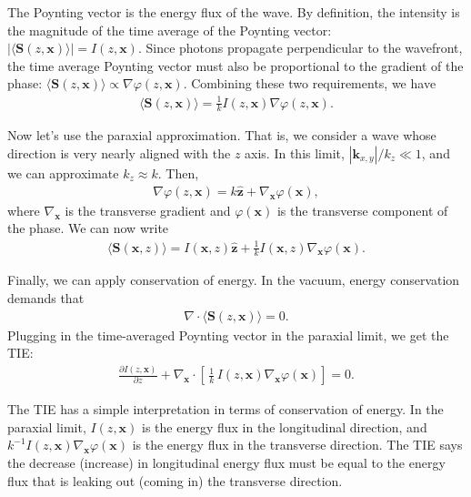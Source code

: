 \documentclass[TS,authoryear,toc]{lsstdoc}
\begin{document}
The Poynting vector is the energy flux of the wave.
By definition, the intensity is the magnitude of the time average of the Poynting vector: $|\langle \mathbf{S}(z, \mathbf{x}) \rangle| = I(z, \mathbf{x})$.
Since photons propagate perpendicular to the wavefront, the time average Poynting vector must also be proportional to the gradient of the phase: $\langle \mathbf{S}(z, \mathbf{x}) \rangle \propto \nabla \varphi(z, \mathbf{x})$.
Combining these two requirements, we have
\begin{align}
    \langle \mathbf{S}(z, \mathbf{x}) \rangle = \frac{1}{k} I(z, \mathbf{x}) \nabla \varphi(z, \mathbf{x}).
\end{align}

Now let's use the paraxial approximation.
That is, we consider a wave whose direction is very nearly aligned with the $z$ axis.
In this limit, $|\mathbf{k}_{x,y}| / k_z \ll 1$, and we can approximate $k_z \approx k$.
Then,
\begin{align}
    \nabla \varphi(z, \mathbf{x}) = k \hat{\mathbf{z}} + \nabla_\mathbf{x} \varphi(\mathbf{x}),
\end{align}
where $\nabla_\mathbf{x}$ is the transverse gradient and $\varphi(\mathbf{x})$ is the transverse component of the phase.
We can now write
\begin{align}
    \langle \mathbf{S}(\mathbf{x}, z) \rangle = 
    I(\mathbf{x}, z) \hat{\mathbf{z}} + \frac{1}{k} I(\mathbf{x}, z) \nabla_\mathbf{x} \varphi(\mathbf{x}).
\end{align}

Finally, we can apply conservation of energy.
In the vacuum, energy conservation demands that
\begin{align}
    \nabla \cdot \langle \mathbf{S}(z, \mathbf{x}) \rangle = 0.
\end{align}
Plugging in the time-averaged Poynting vector in the paraxial limit, we get the TIE:
\begin{align}
    \frac{\partial I(z, \mathbf{x})}{\partial z} + \nabla_\mathbf{x} \cdot \left[\,\frac{1}{k} \, I(z, \mathbf{x}) \nabla_\mathbf{x} \varphi(\mathbf{x})\right] = 0.
    \label{eq:tie-full}
\end{align}

The TIE has a simple interpretation in terms of conservation of energy.
In the paraxial limit, $I(z, \mathbf{x})$ is the energy flux in the longitudinal direction, and $k^{-1} I(z, \mathbf{x}) \nabla_\mathbf{x} \varphi(\mathbf{x})$ is the energy flux in the transverse direction.
The TIE says the decrease (increase) in longitudinal energy flux must be equal to the energy flux that is leaking out (coming in) the transverse direction.
\end{document}
